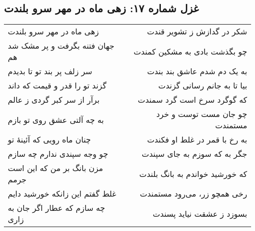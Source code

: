 \begin{center}
\section*{غزل شماره ۱۷: زهی ماه در مهر سرو بلندت}
\label{sec:017}
\begin{longtable}{l p{0.5cm} r}
زهی ماه در مهر سرو بلندت
&&
شکر در گدازش ز تشویر قندت
\\
جهان فتنه بگرفت و پر مشک شد هم
&&
چو بگذشت بادی به مشکین کمندت
\\
سر زلف پر بند تو تا بدیدم
&&
به یک دم شدم عاشق بند بندت
\\
گزند تو را قدر و قیمت که داند
&&
بیا تا به جانم رسانی گزندت
\\
برآر از سر کبر گردی ز عالم
&&
که گوگرد سرخ است گرد سمندت
\\
به چه آلتی عشق روی تو بازم
&&
چو جان مست توست و خرد مستمندت
\\
چنان ماه رویی که آئینهٔ تو
&&
به رخ با قمر در غلط او فکندت
\\
چو وجه سپندی ندارم چه سازم
&&
جگر به که سوزم به جای سپندت
\\
مزن بانگ بر من که این است جرمم
&&
که خورشید خواندم به بانگ بلندت
\\
غلط گفتم این زانکه خورشید دایم
&&
رخی همچو زر، می‌رود مستمندت
\\
چه سازم که عطار اگر جان به زاری
&&
بسوزد ز عشقت نیاید پسندت
\\
\end{longtable}
\end{center}
